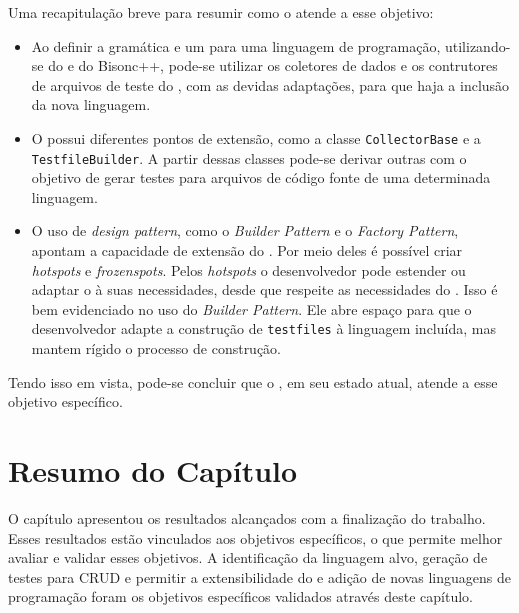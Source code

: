 Uma recapitulação breve para resumir como o \scarefault atende a esse objetivo:
\begin{itemize}
\item Ao definir a gramática e um \parser para uma linguagem de programação,
utilizando-se do \flexcpp e do \textsf{Bisonc++}, pode-se utilizar os coletores
de dados e os contrutores de arquivos de teste do \scarefault, com as devidas
adaptações, para que haja a inclusão da nova linguagem.
\item O \framework possui diferentes pontos de extensão, como a classe
\lstinline|CollectorBase| e a \lstinline|TestfileBuilder|. A partir dessas
classes pode-se derivar outras com o objetivo de gerar testes para arquivos
de código fonte de uma determinada linguagem.
\item O uso de \textit{design pattern}, como o \textit{Builder Pattern} e o
\textit{Factory Pattern}, apontam a capacidade de extensão do \framework. Por
meio deles é possível criar \textit{hotspots} e \textit{frozenspots}. Pelos
\textit{hotspots} o desenvolvedor pode estender ou adaptar o \scarefault à
suas necessidades, desde que respeite as necessidades do \framework. Isso
é bem evidenciado no uso do \textit{Builder Pattern}. Ele abre espaço para
que o desenvolvedor adapte a construção de \lstinline|testfiles| à linguagem
incluída, mas mantem rígido o processo de construção.
\end{itemize}

Tendo isso em vista, pode-se concluir que o \Scarefault, em seu estado atual,
atende a esse objetivo específico.

\section{Resumo do Capítulo}
O capítulo apresentou os resultados alcançados com a finalização do trabalho.
Esses resultados estão vinculados aos objetivos específicos, o que
permite melhor avaliar e validar esses objetivos. A identificação da linguagem
alvo, geração de testes para CRUD e permitir a extensibilidade do \framework
e adição de novas linguagens de programação foram os objetivos específicos
validados através deste capítulo.